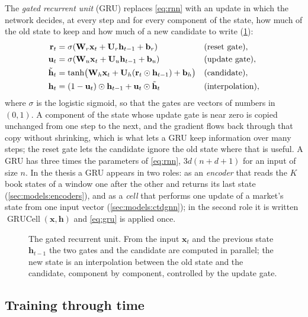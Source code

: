 The \emph{gated recurrent unit} (GRU) \cite{cho2014gru} replaces \cref{eq:rnn} with an update in which the network
decides, at every step and for every component of the state, how much of the old state to
keep and how much of a new candidate to write (\cref{fig:bg:gru}):
\begin{align}
  \mathbf{r}_t &= \sigma(\mathbf{W}_r \mathbf{x}_t + \mathbf{U}_r \mathbf{h}_{t-1} + \mathbf{b}_r)
  && \text{(reset gate)}, \notag \\
  \mathbf{u}_t &= \sigma(\mathbf{W}_u \mathbf{x}_t + \mathbf{U}_u \mathbf{h}_{t-1} + \mathbf{b}_u)
  && \text{(update gate)}, \notag \\
  \tilde{\mathbf{h}}_t &= \tanh\bigl(\mathbf{W}_h \mathbf{x}_t + \mathbf{U}_h (\mathbf{r}_t \odot \mathbf{h}_{t-1}) + \mathbf{b}_h\bigr)
  && \text{(candidate)}, \notag \\
  \mathbf{h}_t &= (1 - \mathbf{u}_t) \odot \mathbf{h}_{t-1} + \mathbf{u}_t \odot \tilde{\mathbf{h}}_t
  && \text{(interpolation)},
  \label{eq:gru}
\end{align}
where $\sigma$ is the logistic sigmoid, so that the gates are vectors of numbers in
$(0, 1)$.  A component of the state whose update gate is near zero is copied unchanged
from one step to the next, and the gradient flows back through that copy without
shrinking, which is what lets a GRU keep information over many steps; the reset gate lets
the candidate ignore the old state where that is useful.  A GRU has three times the
parameters of \cref{eq:rnn}, $3 d (n + d + 1)$ for an input of size $n$.  In the thesis a
GRU appears in two roles: as an \emph{encoder} that reads the $K$ book states of a window
one after the other and returns its last state (\cref{sec:models:encoders}), and as a
\emph{cell} that performs one update of a market's state from one input vector
(\cref{sec:models:ctdgnn}); in the second role it is written $\operatorname{GRUCell}(\mathbf{x},
\mathbf{h})$ and \cref{eq:gru} is applied once.

\begin{figure}[t]
\centering
\resizebox{\textwidth}{!}{}
\caption{The gated recurrent unit.  From the input $\mathbf{x}_t$ and the previous state
$\mathbf{h}_{t-1}$ the two gates and the candidate are computed in parallel; the new state
is an interpolation between the old state and the candidate, component by component,
controlled by the update gate.}
\label{fig:bg:gru}
\end{figure}

\subsection{Training through time}
\label{sec:bg:tbptt}

